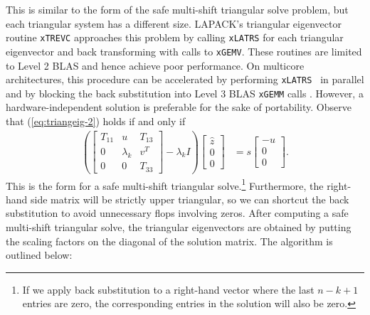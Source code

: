 \documentclass{article}
\begin{document}
This is similar to the form of the safe multi-shift triangular solve
problem, but each triangular system has a different size. LAPACK's
triangular eigenvector routine \texttt{xTREVC} approaches this problem
by calling \texttt{xLATRS} for each triangular eigenvector and back
transforming with calls to \texttt{xGEMV}. These routines are limited
to Level 2 BLAS and hence achieve poor performance. On multicore
architectures, this procedure can be accelerated by performing
\texttt{xLATRS } in parallel and by blocking the back substitution
into Level 3 BLAS \texttt{xGEMM} calls
\cite{gates2014accelerating}. However, a hardware-independent solution
is preferable for the sake of portability.  Observe that
(\ref{eq:triangeig-2}) holds if and only if
\begin{align}
  \left(\left[
    \begin{matrix}
      T_{11} & u & T_{13} \\
      0 & \lambda_k & v^T \\
      0 & 0 & T_{33}
    \end{matrix}
  \right] - \lambda_k I\right)
  \left[
    \begin{matrix}
      \hat{z} \\ 0 \\ 0
    \end{matrix}
  \right]
  &=
  s \left[
    \begin{matrix}
      -u \\ 0 \\ 0
    \end{matrix}
  \right].
\end{align}
This is the form for a safe multi-shift triangular solve.\footnote{If
  we apply back substitution to a right-hand vector where the last
  \(n-k+1\) entries are zero, the corresponding entries in the
  solution will also be zero.} Furthermore, the right-hand side matrix
will be strictly upper triangular, so we can shortcut the back
substitution to avoid unnecessary flops involving zeros. After
computing a safe multi-shift triangular solve, the triangular
eigenvectors are obtained by putting the scaling factors on the
diagonal of the solution matrix. The algorithm is outlined below:
\end{document}
